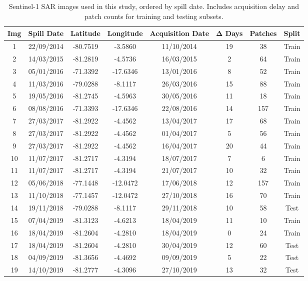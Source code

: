\documentclass[12pt]{article}
\begin{document}
\begin{table}[p]
\centering
\caption{Sentinel-1 SAR images used in this study, ordered by spill date. Includes acquisition delay and patch counts for training and testing subsets.}
\label{tab:peruvian_selection}
\scriptsize
\begin{tabular}{|c|c|c|c|c|c|c|c|}
\hline
\textbf{Img} & \textbf{Spill Date} & \textbf{Latitude} & \textbf{Longitude} & \textbf{Acquisition Date} & \textbf{Δ Days} & \textbf{Patches} & \textbf{Split} \\
\hline
1 & 22/09/2014 & -80.7519 & -3.5860 & 11/10/2014 & 19 & 38 & Train \\
2 & 14/03/2015 & -81.2819 & -4.5736 & 16/03/2015 & 2 & 64 & Train \\
3 & 05/01/2016 & -71.3392 & -17.6346 & 13/01/2016 & 8 & 52 & Train \\
4 & 11/03/2016 & -79.0288 & -8.1117 & 26/03/2016 & 15 & 88 & Train \\
5 & 19/05/2016 & -81.2745 & -4.5963 & 30/05/2016 & 11 & 18 & Train \\
6 & 08/08/2016 & -71.3393 & -17.6346 & 22/08/2016 & 14 & 157 & Train \\
7 & 27/03/2017 & -81.2922 & -4.4562 & 13/04/2017 & 17 & 68 & Train \\
8 & 27/03/2017 & -81.2922 & -4.4562 & 01/04/2017 & 5 & 56 & Train \\
9 & 27/03/2017 & -81.2922 & -4.4562 & 16/04/2017 & 20 & 44 & Train \\
10 & 11/07/2017 & -81.2717 & -4.3194 & 18/07/2017 & 7 & 6 & Train \\
11 & 11/07/2017 & -81.2717 & -4.3194 & 21/07/2017 & 10 & 32 & Train \\
12 & 05/06/2018 & -77.1448 & -12.0472 & 17/06/2018 & 12 & 157 & Train \\
13 & 11/10/2018 & -77.1457 & -12.0472 & 27/10/2018 & 16 & 70 & Train \\
14 & 19/11/2018 & -79.0288 & -8.1117 & 29/11/2018 & 10 & 58 & Test \\
15 & 07/04/2019 & -81.3123 & -4.6213 & 18/04/2019 & 11 & 10 & Train \\
16 & 18/04/2019 & -81.2604 & -4.2810 & 18/04/2019 & 0 & 24 & Train \\
17 & 18/04/2019 & -81.2604 & -4.2810 & 30/04/2019 & 12 & 60 & Test \\
18 & 04/09/2019 & -81.3656 & -4.4692 & 09/09/2019 & 5 & 22 & Test \\
19 & 14/10/2019 & -81.2777 & -4.3096 & 27/10/2019 & 13 & 32 & Test \\

\end{tabular}
\end{table}
\end{document}
